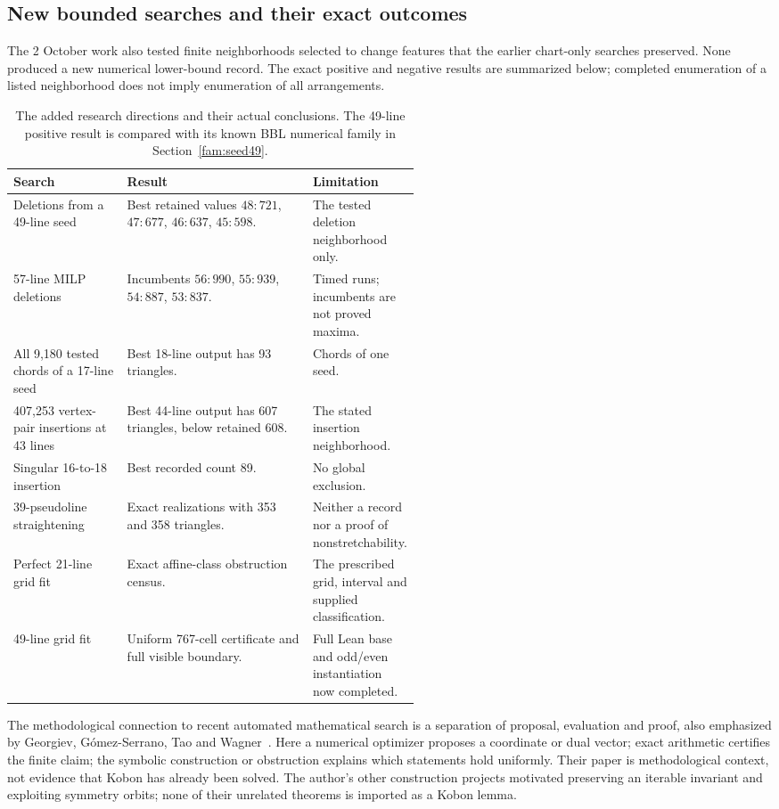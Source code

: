 \subsection{New bounded searches and their exact outcomes}

The 2 October work also tested finite neighborhoods selected to change
features that the earlier chart-only searches preserved. None produced
a new numerical lower-bound record. The exact positive and negative
results are summarized below; completed enumeration of a listed
neighborhood does not imply enumeration of all arrangements.

\begin{table}[tb]
\centering\small
\begin{tabularx}{\linewidth}{@{}P{0.29\linewidth}XP{0.24\linewidth}@{}}
\toprule
Search & Result & Limitation\\
\midrule
Deletions from a 49-line seed & Best retained values $48:721$, $47:677$,
$46:637$, $45:598$. & The tested deletion neighborhood only.\\
57-line MILP deletions & Incumbents $56:990$, $55:939$, $54:887$,
$53:837$. & Timed runs; incumbents are not proved maxima.\\
All 9,180 tested chords of a 17-line seed & Best 18-line output has 93
triangles. & Chords of one seed.\\
407,253 vertex-pair insertions at 43 lines & Best 44-line output has
607 triangles, below retained 608. & The stated insertion neighborhood.\\
Singular 16-to-18 insertion & Best recorded count 89. & No global
exclusion.\\
39-pseudoline straightening & Exact realizations with 353 and 358
triangles. & Neither a record nor a proof of nonstretchability.\\
Perfect 21-line grid fit & Exact affine-class obstruction census. & The
prescribed grid, interval and supplied classification.\\
49-line grid fit & Uniform 767-cell certificate and full visible boundary.
& Full Lean base and odd/even instantiation now completed.\\
\bottomrule
\end{tabularx}
\caption{The added research directions and their actual conclusions.
The 49-line positive result is compared with its known BBL numerical
family in Section~\ref{fam:seed49}.}
\label{exp:october-searches}
\end{table}

The methodological connection to recent automated mathematical search
is a separation of proposal, evaluation and proof, also emphasized by
Georgiev, G\'omez-Serrano, Tao and Wagner~\cite{georgiev2025}. Here a
numerical optimizer proposes a coordinate or dual vector; exact
arithmetic certifies the finite claim; the symbolic construction or
obstruction explains which statements hold uniformly. Their paper is
methodological context, not evidence that Kobon has already been solved.
The author's other construction projects motivated preserving an
iterable invariant and exploiting symmetry orbits; none of their
unrelated theorems is imported as a Kobon lemma.

